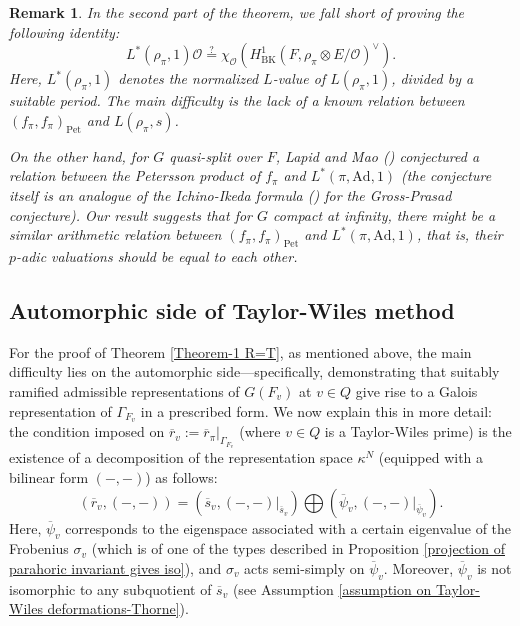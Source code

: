 \documentclass[12pt,oneside,reqno]{amsart}
\theoremstyle{plain}
\newtheorem{remark}[theorem]{Remark}
\begin{document}
	
	\begin{remark}\rm
		In the second part of the theorem, we fall short of proving the following identity:
		\[
		L^\ast(\rho_\pi,1)\mathcal{O}
		\stackrel{?}{=}
		\chi_\mathcal{O}(H^1_\mathrm{BK}(F,\rho_\pi\otimes E/\mathcal{O})^\vee).
		\]
		Here, $L^\ast(\rho_\pi,1)$ denotes the normalized $L$-value of $L(\rho_\pi,1)$, divided by a suitable period. The main difficulty is the lack of a known relation between $(f_\pi,f_\pi)_\mathrm{Pet}$ and $L(\rho_\pi,s)$.
		
		
		On the other hand, for $G$ quasi-split over $F$, Lapid and Mao (\cite{LapidMao2015}) conjectured a relation between the Petersson product of $f_\pi$ and $L^\ast(\pi,\mathrm{Ad},1)$ (the conjecture itself is an analogue of the Ichino-Ikeda formula (\cite{IchinoIkeda2010}) for the Gross-Prasad conjecture). Our result suggests that for $G$ compact at infinity, there might be a similar \emph{arithmetic} relation between $(f_\pi,f_\pi)_\mathrm{Pet}$ and $L^\ast(\pi,\mathrm{Ad},1)$, that is, their $p$-adic valuations should be equal to each other.
	\end{remark}
	
	
	
	
	
	\subsection*{Automorphic side of Taylor-Wiles method}
	For the proof of Theorem \ref{Theorem-1 R=T}, as mentioned above, the main difficulty lies on the automorphic side—specifically, demonstrating that suitably ramified admissible representations of $G(F_v)$ at $v\in Q$ give rise to a Galois representation of $\Gamma_{F_v}$ in a prescribed form. We now explain this in more detail: the condition imposed on $\overline{r}_v := \overline{r}_\pi|_{\Gamma_{F_v}}$ (where $v \in Q$ is a Taylor-Wiles prime) is the existence of a decomposition of the representation space $\kappa^N$ (equipped with a bilinear form $(-,-)$) as follows:
	\[
	(\overline{r}_v,(-,-))
	=
	(\overline{s}_v,(-,-)|_{\overline{s}_v})
	\bigoplus
	(\overline{\psi}_v,(-,-)|_{\overline{\psi}_v}).
	\]
	Here, $\overline{\psi}_v$ corresponds to the eigenspace associated with a certain eigenvalue of the Frobenius $\sigma_v$ (which is of one of the types described in Proposition \ref{projection of parahoric invariant gives iso}), and $\sigma_v$ acts semi-simply on $\overline{\psi}_v$. Moreover, $\overline{\psi}_v$ is not isomorphic to any subquotient of $\overline{s}_v$ (see Assumption \ref{assumption on Taylor-Wiles deformations-Thorne}).
	
\end{document}
